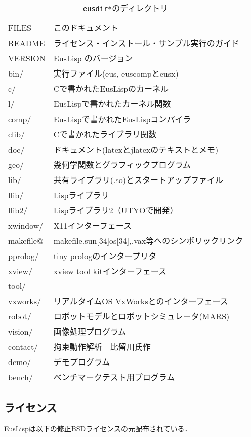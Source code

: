 \begin{table}
\caption{\label{Directories}{\tt *eusdir*}のディレクトリ}
\begin{center}
{\footnotesize
\begin{tabular}{|l | l|}\hline 
FILES &  このドキュメント \\
README &  ライセンス・インストール・サンプル実行のガイド\\
VERSION &  EusLisp のバージョン\\
bin/ &  実行ファイル(eus, euscompとeusx)\\
c/ &  Cで書かれたEusLispのカーネル\\
l/ &  EusLispで書かれたカーネル関数\\
comp/ &  EusLispで書かれたEusLispコンパイラ\\
clib/ &  Cで書かれたライブラリ関数\\
doc/ &  ドキュメント(latexとjlatexのテキストとメモ)\\
geo/ &  幾何学関数とグラフィックプログラム\\
lib/ & 共有ライブラリ(.so)とスタートアップファイル\\
llib/ &  Lispライブラリ\\
llib2/ &  Lispライブラリ2（UTYOで開発）\\
xwindow/ &  X11インターフェース\\
makefile@ &  makefile.sun[34]os[34],.vax等へのシンボリックリンク\\
pprolog/ &  tiny prologのインタープリタ\\
xview/ &  xview tool kitインターフェース\\
tool/ & \\
vxworks/ & リアルタイムOS VxWorksとのインターフェース\\
robot/ & ロボットモデルとロボットシミュレータ(MARS)\\
vision/ &  画像処理プログラム\\
contact/ & 拘束動作解析　比留川氏作
\cite{Hirukawa:1991a,Hirukawa:1991b,Hirukawa:1991c}\\
demo/ &  デモプログラム\\
bench/ &  ベンチマークテスト用プログラム\\ \hline
\end{tabular}
}
\end{center}
\end{table}

\subsection{\label{License}ライセンス}
EusLispは以下の修正BSDライセンスの元配布されている．

